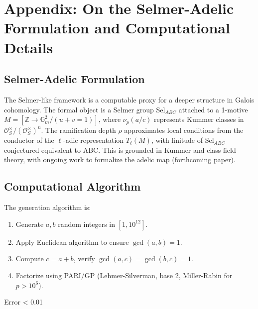 \documentclass[11pt,a4paper]{article}
\newcommand{\Z}{\mathbb{Z}}
\newcommand{\Sel}{\mathrm{Sel}}
\begin{document}
\appendix
\section{Appendix: On the Selmer-Adelic Formulation and Computational Details}

\subsection{Selmer-Adelic Formulation}
The Selmer-like framework is a computable proxy for a deeper structure in Galois cohomology. The formal object is a Selmer group \(\Sel_{ABC}\) attached to a 1-motive \(M = [\Z \to \mathbb{G}_m^2 / (u+v=1)]\), where \(\nu_p(a/c)\) represents Kummer classes in \(\mathcal{O}_S^\times / (\mathcal{O}_S^\times)^n\). The ramification depth \(\rho\) approximates local conditions from the conductor of the \(\ell\)-adic representation \(T_\ell(M)\), with finitude of \(\Sel_{ABC}\) conjectured equivalent to ABC. This is grounded in Kummer and class field theory, with ongoing work to formalize the adelic map (forthcoming paper).

\subsection{Computational Algorithm}
The generation algorithm is:
\begin{enumerate}
    \item Generate \(a, b\) random integers in \([1, 10^{12}]\).
    \item Apply Euclidean algorithm to ensure \(\gcd(a,b)=1\).
    \item Compute \(c = a + b\), verify \(\gcd(a,c)=\gcd(b,c)=1\).
    \item Factorize using PARI/GP (Lehmer-Silverman, base 2, Miller-Rabin for \(p > 10^6\)).
\end{enumerate}
Error < 0.01%
\end{document}
